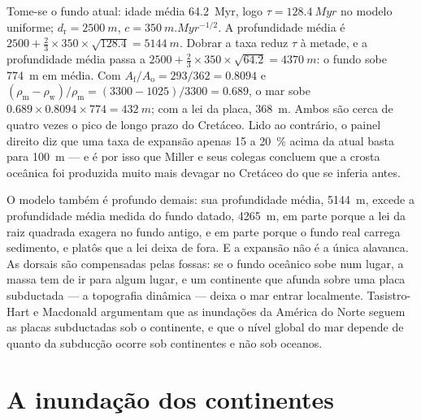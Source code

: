 \begin{example}\label{ex:b2:phanerozoic-earth:doubling}
Tome-se o fundo atual: idade média \qty{64.2}{Myr}, logo $\tau = \qty{128.4}{Myr}$ no modelo uniforme;
$d_{\text{r}} = \qty{2500}{m}$, $c = \qty{350}{m.Myr^{-1/2}}$. A profundidade média é $2500 + \tfrac23
\times 350 \times \sqrt{128.4} = \qty{5144}{m}$. Dobrar a taxa reduz $\tau$ à metade, e a profundidade
média passa a $2500 + \tfrac23 \times 350 \times \sqrt{64.2} = \qty{4370}{m}$: o fundo sobe
\qty{774}{m} em média. Com $A_{\text{f}}/A_{\text{o}} = 293/362 = 0.8094$ e
$(\rho_{\text{m}} - \rho_{\text{w}})/\rho_{\text{m}} = (3300 - 1025)/3300 = 0.689$, o mar sobe
$0.689 \times 0.8094 \times 774 = \qty{432}{m}$; com a lei da placa, \qty{368}{m}. Ambos são
cerca de quatro vezes o pico de longo prazo do Cretáceo. Lido ao contrário, o painel direito diz que uma
taxa de expansão apenas 15 a \qty{20}{\percent} acima da atual basta para \qty{100}{m} --- e é
por isso que Miller e seus colegas concluem que a crosta oceânica foi produzida muito mais devagar no
Cretáceo do que se inferia antes.
\end{example}

O modelo também é profundo demais: sua profundidade média, \qty{5144}{m}, excede a profundidade média medida
do fundo datado, \qty{4265}{m}, em parte porque a lei da raiz quadrada exagera no fundo antigo, e
em parte porque o fundo real carrega sedimento,  e platôs que a lei deixa de fora. E a expansão não é a
única alavanca. As dorsais são compensadas pelas fossas: se o fundo oceânico sobe num lugar, a massa tem de
ir para algum lugar, e um continente que afunda sobre uma placa subductada --- a topografia dinâmica --- deixa o mar entrar
localmente. Tasistro-Hart e Macdonald argumentam que as inundações da América do Norte seguem as placas subductadas
sob o continente, e que o nível global do mar depende de quanto da subducção ocorre sob
continentes e não sob oceanos.

\section{A inundação dos continentes}\label{sec:b2:phanerozoic-earth:flooding}

